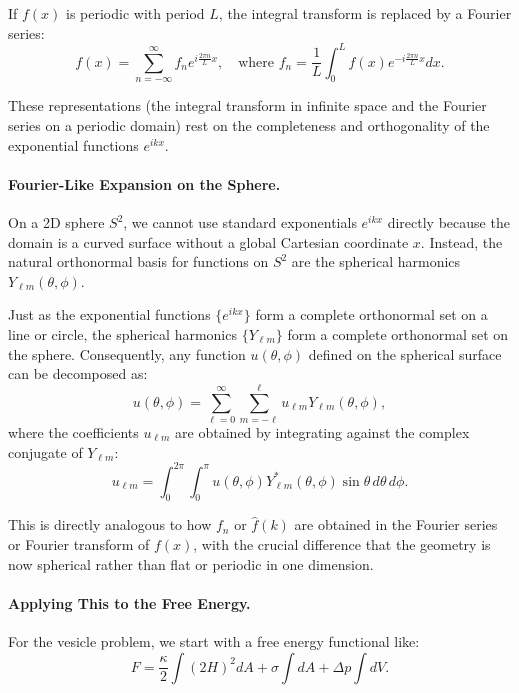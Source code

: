 \documentclass[12pt,a4paper]{article}
\begin{document}
If $f(x)$ is periodic with period $L$, the integral transform is replaced by a Fourier series:
\begin{equation}
f(x) = \sum_{n=-\infty}^{\infty} f_n e^{i\frac{2\pi n}{L} x}, \quad \text{where } f_n = \frac{1}{L}\int_0^{L} f(x) e^{-i\frac{2\pi n}{L} x} dx.
\end{equation}

These representations (the integral transform in infinite space and the Fourier series on a periodic domain) rest on the completeness and orthogonality of the exponential functions $e^{ikx}$.

\paragraph{Fourier-Like Expansion on the Sphere.}

On a 2D sphere $S^2$, we cannot use standard exponentials $e^{ikx}$ directly because the domain is a curved surface without a global Cartesian coordinate $x$. Instead, the natural orthonormal basis for functions on $S^2$ are the spherical harmonics $Y_{\ell m}(\theta,\phi)$.

Just as the exponential functions $\{e^{i k x}\}$ form a complete orthonormal set on a line or circle, the spherical harmonics $\{Y_{\ell m}\}$ form a complete orthonormal set on the sphere. Consequently, any function $u(\theta,\phi)$ defined on the spherical surface can be decomposed as:
\begin{equation}
u(\theta,\phi) = \sum_{\ell=0}^{\infty}\sum_{m=-\ell}^{\ell} u_{\ell m} Y_{\ell m}(\theta,\phi),
\end{equation}
where the coefficients $u_{\ell m}$ are obtained by integrating against the complex conjugate of $Y_{\ell m}$:
\begin{equation}
u_{\ell m} = \int_0^{2\pi}\int_0^\pi u(\theta,\phi) Y_{\ell m}^*(\theta,\phi)\sin\theta\, d\theta\, d\phi.
\end{equation}

This is directly analogous to how $f_n$ or $\hat{f}(k)$ are obtained in the Fourier series or Fourier transform of $f(x)$, with the crucial difference that the geometry is now spherical rather than flat or periodic in one dimension.

\paragraph{Applying This to the Free Energy.}

For the vesicle problem, we start with a free energy functional like:
\begin{equation}
F = \frac{\kappa}{2}\int (2H)^2 dA + \sigma \int dA + \Delta p \int dV.
\end{equation}
\end{document}
